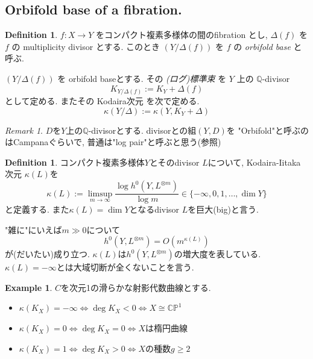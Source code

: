 \documentclass[dvipdfmx,a4paper,11pt]{article} %
\theoremstyle{definition}
\newtheorem{defn}[thm]{Definition}
\newtheorem{ex}[thm]{Example}
\theoremstyle{remark}
\newtheorem{rem}[thm]{Remark}
\numberwithin{equation}{section}
\newcommand{\C}{\mathbb{C}}
\newcommand{\Q}{\mathbb{Q}}
\begin{document}
\subsection{Orbifold base of a fibration. \cite[1.2.2]{Cam04}}

\begin{defn}\cite[Definition  1.5, 1.6]{Cam04}
\(f : X \to Y\) をコンパクト複素多様体の間のfibration とし, 
\(\Delta(f)\) を \(f\) の multiplicity divisor とする.
このとき \((Y/\Delta(f))\) を \(f\) の \emph{orbifold base} と呼ぶ.

\((Y/\Delta(f))\) を orbifold baseとする.
その \emph{(ログ)標準束} を \(Y\) 上の \(\mathbb{Q}\)-divisor
\[
K_{Y/\Delta(f)} := K_Y + \Delta(f)
\]
として定める.
またその Kodaira次元 を次で定める. 
\[
\kappa(Y/\Delta) := \kappa(Y, K_Y + \Delta)
\]
\end{defn}

\begin{rem}
$D$を$Y$上の$\Q$-divisorとする. 
divisorとの組$(Y, D)$を
"Orbifold"と呼ぶのはCampanaぐらいで, 普通は"log pair"と呼ぶと思う(\cite{KM98}参照)
\end{rem}


\begin{defn}\cite[Section 1]{Laz04}\cite[Remark 2.3.17]{Fuj20}
コンパクト複素多様体$Y$とそのdivisor $L$について, Kodaira-Iitaka 次元 $\kappa (L)$を
$$
\kappa(L):= \limsup_{m \to \infty}\frac{\log h^0(Y, L^{\otimes m})}{ \log m}
\in \{- \infty, 0, 1, \ldots, \dim Y \}
$$
と定義する.
また$\kappa(L) = \dim Y$となるdivisor $L$を巨大(big)と言う. 

\end{defn}
"雑に"にいえば$m \gg 0$について
$$
h^0(Y, L^{\otimes m}) = O(m^{\kappa(L)})
$$
が(だいたい)成り立つ.
$\kappa(L)$は$h^0(Y, L^{\otimes m})$の増大度を表している. 
$\kappa(L)=-\infty$とは大域切断が全くないことを言う.

\begin{ex}
$C$を次元1の滑らかな射影代数曲線とする.
\begin{itemize}
\item $\kappa(K_X) = - \infty \Leftrightarrow \deg K_X <0 \Leftrightarrow X \cong \C\mathbb{P}^1$ 
\item $\kappa(K_X) = 0 \Leftrightarrow \deg K_X =0 \Leftrightarrow X  \text{は楕円曲線}$ 
\item $\kappa(K_X) = 1 \Leftrightarrow \deg K_X >0 \Leftrightarrow X \text{の種数$g \ge 2$}$ 
\end{itemize}
\end{ex}
\end{document}
